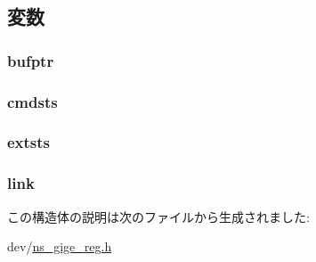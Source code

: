 \subsection{変数}
\hypertarget{structns__desc32_a92de6ac5a104ad75c84325904a146a5f}{
\subsubsection[{bufptr}]{ {\bf bufptr}}}
\label{structns__desc32_a92de6ac5a104ad75c84325904a146a5f}
\hypertarget{structns__desc32_a7484a3aa644dde4355c24a2c6365715d}{
\subsubsection[{cmdsts}]{ {\bf cmdsts}}}
\label{structns__desc32_a7484a3aa644dde4355c24a2c6365715d}
\hypertarget{structns__desc32_ad874b18768bd13482acfbe2b4825996a}{
\subsubsection[{extsts}]{ {\bf extsts}}}
\label{structns__desc32_ad874b18768bd13482acfbe2b4825996a}
\hypertarget{structns__desc32_a6163461798acb053ba062347095330e0}{
\subsubsection[{link}]{ {\bf link}}}
\label{structns__desc32_a6163461798acb053ba062347095330e0}


この構造体の説明は次のファイルから生成されました:\begin{DoxyCompactItemize}
\item 
dev/\hyperlink{ns__gige__reg_8h}{ns\_\-gige\_\-reg.h}\end{DoxyCompactItemize}
